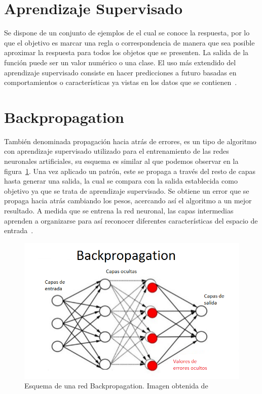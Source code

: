 \section{Aprendizaje Supervisado}
Se dispone de un conjunto de ejemplos de el cual se conoce la respuesta, por lo que el objetivo es marcar una regla o correspondencia de manera que sea posible aproximar la respuesta para todos los objetos que se presenten. La salida de la función puede ser un valor numérico o una clase.
El uso más extendido del aprendizaje supervisado consiste en hacer predicciones a futuro basadas en comportamientos o características ya vistas en los datos que se contienen~\cite{alejandrocassis_aprendizaje_2015}.

\section{Backpropagation}
También denominada propagación hacia atrás de errores, es un tipo de algoritmo con aprendizaje supervisado utilizado para el entrenamiento de las redes neuronales artificiales, su esquema es similar al que podemos observar en la figura~\ref{fig:Backpro}. Una vez aplicado un patrón, este se propaga a través del resto de capas hasta generar una salida, la cual se compara con la salida establecida como objetivo ya que se trata de aprendizaje supervisado. Se obtiene un error que se propaga hacia atrás cambiando los pesos, acercando así el algoritmo a un mejor resultado.
A medida que se entrena la red neuronal, las capas intermedias aprenden a organizarse para así reconocer diferentes características del espacio de entrada~\cite{backpropagation_2015}.

\begin{figure}
\centering
\includegraphics[width=.9\textwidth]{img/backpropagation}
\caption[Esquema de una red Backpropagation]{Esquema de una red Backpropagation. Imagen obtenida de~\cite{imagen_backpropagation}}
\label{fig:Backpro}
\end{figure}



